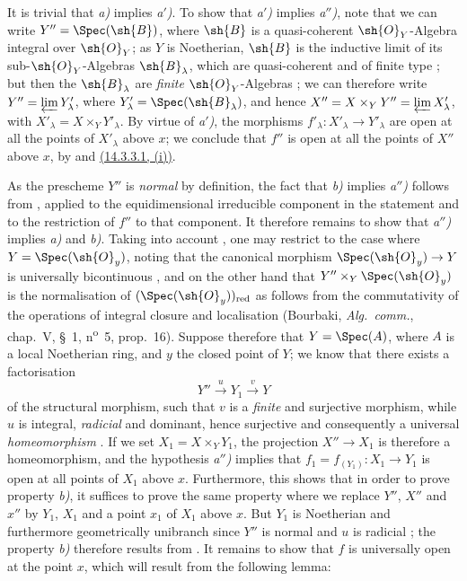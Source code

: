 It is trivial that \emph{a)} implies \emph{a$'$)}.
To show that \emph{a$'$)} implies \emph{a$''$)}, note that we can write $Y''=\Spec(\sh{B})$, where $\sh{B}$ is a quasi-coherent $\sh{O}_Y$-Algebra integral over $\sh{O}_Y$; as $Y$ is Noetherian, $\sh{B}$ is the inductive limit of its sub-$\sh{O}_Y$-Algebras $\sh{B}_\lambda$, which are quasi-coherent and of finite type ; but then the $\sh{B}_\lambda$ are \emph{finite} $\sh{O}_Y$-Algebras ; we can therefore write $Y''=\varprojlim Y'_\lambda$, where $Y'_\lambda=\Spec(\sh{B}_\lambda)$, and hence $X''=X\times_Y Y''=\varprojlim X'_\lambda$, with $X'_\lambda=X\times_Y Y'_\lambda$.
By virtue of \emph{a$'$)}, the morphisms $f'_\lambda:X'_\lambda\to Y'_\lambda$ are open at all the points of $X'_\lambda$ above $x$; we conclude that $f''$ is open at all the points of $X''$ above $x$, by  and {\hyperlink{ega4.c04.subsec.14-3-3-1}{(14.3.3.1, (i))}}.

As the prescheme $Y''$ is \emph{normal} by definition, the fact that \emph{b)} implies \emph{a$''$)} follows from , applied to the equidimensional irreducible component in the statement and to the restriction of $f''$ to that component.
It therefore remains to show that \emph{a$''$)} implies \emph{a)} and \emph{b)}.
Taking into account , one may restrict to the case where $Y=\Spec(\sh{O}_y)$, noting that the canonical morphism $\Spec(\sh{O}_y)\to Y$ is universally bicontinuous , and on the other hand that $Y''\times_Y\Spec(\sh{O}_y)$ is the normalisation of $(\Spec(\sh{O}_y))_{\mathrm{red}}$ as follows from the commutativity of the operations of integral closure and localisation (Bourbaki, \emph{Alg.\ comm.}, chap.~V, \S~1, n\textsuperscript{o}~5, prop.~16).
Suppose therefore that $Y=\Spec(A)$, where $A$ is a local Noetherian ring, and $y$ the closed point of $Y$; we know  that there exists a factorisation
\[
  Y'' \xrightarrow{u} Y_1 \xrightarrow{v} Y
\]
of the structural morphism, such that $v$ is a \emph{finite} and surjective morphism, while $u$ is integral, \emph{radicial} and dominant, hence surjective  and consequently a universal \emph{homeomorphism} .
If we set $X_1=X\times_Y Y_1$, the projection $X''\to X_1$ is therefore a homeomorphism, and the hypothesis \emph{a$''$)} implies that $f_1=f_{(Y_1)}:X_1\to Y_1$ is open at all points of $X_1$ above $x$.
Furthermore, this shows that in order to prove property \emph{b)}, it suffices to prove the same property where we replace $Y''$, $X''$ and $x''$ by $Y_1$, $X_1$ and a point $x_1$ of $X_1$ above $x$.
But $Y_1$ is Noetherian and furthermore geometrically unibranch since $Y''$ is normal and $u$ is radicial ; the property \emph{b)} therefore results from .
It remains to show that $f$ is universally open at the point $x$, which will result from the following lemma:

